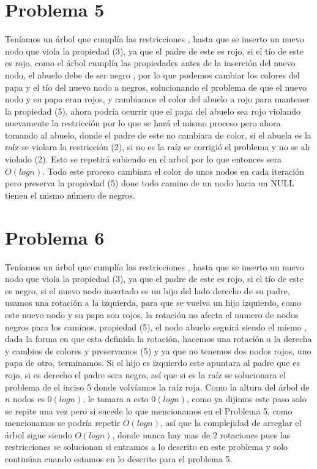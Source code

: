 \documentclass[12pt,letterpaper]{article}
\begin{document}
\section{Problema 5}
    Teníamos un árbol que cumplía las restricciones , hasta que se inserto un nuevo nodo que viola la propiedad (3), ya que el padre de este es rojo, si el tío de este es rojo, como el árbol cumplía las propiedades antes de la inserción del nuevo nodo, el abuelo debe de ser negro , por lo que podemos cambiar los colores del papa y el tío del nuevo nodo a negros, solucionando el problema de que el nuevo nodo y su papa eran rojos, y cambiamos el color del abuelo a rojo para mantener la propiedad (5), ahora podría ocurrir que el papa del abuelo sea rojo violando nuevamente la restricción por lo que se hará el mismo proceso pero ahora tomando al abuelo, donde el padre de este no cambiara de color, si el abuela es la raíz se violara la restricción (2), si no es la raíz se corrigió el problema y no se ah violado (2). Esto se repetirá subiendo en el arbol por lo que entonces sera $O(log n)$. Todo este proceso cambiara el color de unos nodos en cada iteración pero preserva la propiedad (5) done todo camino de un nodo hacia un NULL  tienen el mismo número de negros.
\section{Problema 6}
    Teníamos un árbol que cumplía las restricciones , hasta que se inserto un nuevo nodo que viola la propiedad (3), ya que el padre de este es rojo, si el tío de este es negro, si el nuevo nodo insertado es un hijo del lado derecho de su padre, usamos una rotación a la izquierda, para que se vuelva un hijo izquierdo, como este nuevo nodo y su papa son rojos, la rotación no afecta el numero de nodos negros para los caminos, propiedad (5), el nodo abuelo seguirá siendo el mismo , dada la forma en que esta definida la rotación, hacemos una rotación a la derecha y cambios de colores y preservamos (5) y ya que no tenemos dos nodos rojos, uno papa de otro, terminamos. Si el hijo es izquierdo este apuntara al padre que es rojo, si es derecho el padre sera negro, así que si es la raíz se solucionara el problema de el inciso 5 donde volvíamos la raíz roja. Como la altura del árbol de $n$ nodos es $0(log n)$, le tomara a esto $0(log n)$, como ya dijimos este paso solo se repite una vez pero si sucede lo que mencionamos en el Problema 5, como mencionamos se podría repetir $O(log n)$, así que la complejidad de arreglar el árbol sigue siendo $O(log n)$, donde nunca hay mas de 2 rotaciones pues las restricciones se solucionan si entramos a lo descrito en este problema y solo continúan cuando estamos en lo descrito para el problema 5.   
\end{document}
